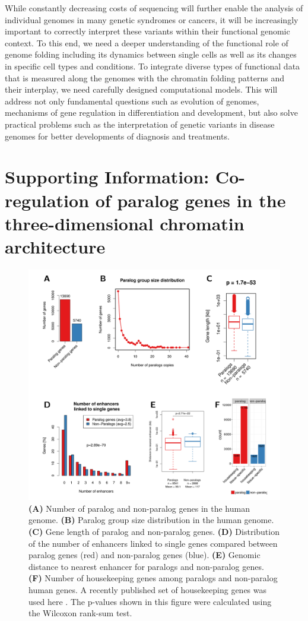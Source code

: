 \documentclass[a4paper,twoside=true,openright,parskip=full,chapterprefix=true,11pt,headings=normal,bibliography=totoc,listof=totoc,titlepage=on,captions=tableabove,draft=false]{scrreprt}
\theoremstyle{definition}
\theoremstyle{definition}
\theoremstyle{definition}
\theoremstyle{remark}
\begin{document}
While constantly decreasing costs of sequencing will further enable the
analysis of individual genomes in many genetic syndromes or cancers, it
will be increasingly important to correctly interpret these variants
within their functional genomic context. To this end, we need a deeper
understanding of the functional role of genome folding including its
dynamics between single cells as well as its changes in specific cell
types and conditions. To integrate diverse types of functional data that
is measured along the genomes with the chromatin folding patterns and
their interplay, we need carefully designed computational models. This
will address not only fundamental questions such as evolution of
genomes, mechanisms of gene regulation in differentiation and
development, but also solve practical problems such as the
interpretation of genetic variants in disease genomes for better
developments of diagnosis and treatments.

\appendix


\chapter{Supporting Information: Co-regulation of paralog genes in the
three-dimensional chromatin
architecture}\label{supporting-information-co-regulation-of-paralog-genes-in-the-three-dimensional-chromatin-architecture}

\begin{figure}

{\centering \includegraphics[width=0.5\linewidth]{figures/paralog/SI/figS1} 

}

\caption{\textbf{(A)} Number of paralog and non-paralog genes
in the human genome. \textbf{(B)} Paralog group size distribution in the
human genome. \textbf{(C)} Gene length of paralog and non-paralog genes.
\textbf{(D)} Distribution of the number of enhancers linked to single
genes compared between paralog genes (red) and non-paralog genes (blue).
\textbf{(E)} Genomic distance to nearest enhancer for paralogs and
non-paralog genes. \textbf{(F)} Number of housekeeping genes among
paralogs and non-paralog human genes. A recently published set of
housekeeping genes was used here \citep{Eisenberg2013}. The p-values
shown in this figure were calculated using the Wilcoxon rank-sum test.}\label{fig:paraVSnonPara}
\end{figure}
\end{document}

